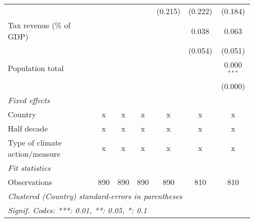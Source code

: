 \begin{tabular}{lcccccc}
                                           &               &               &               & (0.215)        & (0.222)        & (0.184)\\   
   Tax revenue (\% of GDP)                 &               &               &               &                & 0.038          & 0.063\\   
                                           &               &               &               &                & (0.054)        & (0.051)\\   
   Population total                        &               &               &               &                &                & 0.000$^{***}$\\   
                                           &               &               &               &                &                & (0.000)\\   
   \emph{Fixed effects}\\
   Country                                 & x             & x             & x             & x              & x              & x\\  
   Half decade                             & x             & x             & x             & x              & x              & x\\  
   Type of climate action/measure          & x             & x             & x             & x              & x              & x\\  
   \midrule \emph{Fit statistics}\\
   Observations                            & 890           & 890           & 890           & 890            & 810            & 810\\  
   \midrule
   \multicolumn{7}{l}{\emph{Clustered (Country) standard-errors in parentheses}}\\
   \multicolumn{7}{l}{\emph{Signif. Codes: ***: 0.01, **: 0.05, *: 0.1}}\\
\end{tabular}
\par\endgroup


